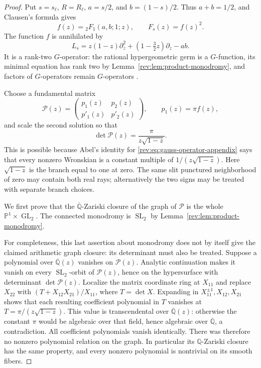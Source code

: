 \begin{proof}
Put $s=s_\ell$, $R=R_\ell$, $a=s/2$, and $b=(1-s)/2$.  Thus
$a+b=1/2$, and Clausen's formula gives
\[
 f(z)={}_2F_1(a,b;1;z),\qquad F_s(z)=f(z)^2.
\]
The function $f$ is annihilated by
\begin{equation}\label{rev:eq:gauss-operator-appendix}
 L_s=z(1-z)\partial_z^2+
          (1-\tfrac32z)\partial_z-ab.
\end{equation}
It is a rank-two $G$-operator: the rational hypergeometric germ is a
$G$-function, its minimal equation has rank two by
Lemma~\ref{rev:lem:product-monodromy}, and factors of $G$-operators
remain $G$-operators \cite[Theorem~3.5]{BaldiBinyaminiUrbanik2026}.

Choose a fundamental matrix
\[
 \mathcal P(z)=
 \begin{pmatrix}p_1(z)&p_2(z)\\p'_1(z)&p'_2(z)\end{pmatrix},
 \qquad p_1(z)=\pi f(z),
\]
and scale the second solution so that
\begin{equation}\label{eq:C-wronskian}
 \det\mathcal P(z)=\frac{\pi}{z\sqrt{1-z}}.
\end{equation}
This is possible because Abel's identity for
\eqref{rev:eq:gauss-operator-appendix} says that every nonzero Wronskian is a
constant multiple of $1/(z\sqrt{1-z})$.  Here $\sqrt{1-z}$ is the
branch equal to one at zero.  The same slit punctured neighborhood
of zero may contain both real rays; alternatively the two signs
may be treated with separate branch choices.

We first prove that the $\overline{\mathbb Q}$-Zariski closure of
the graph of $\mathcal P$ is the whole
$\mathbb P^1\times\operatorname{GL}_2$.  The connected monodromy is $\operatorname{SL}_2$ by
Lemma~\ref{rev:lem:product-monodromy}.

For completeness, this last assertion about monodromy does not by
itself give the claimed arithmetic graph closure: its determinant
must also be treated.  Suppose a polynomial over
$\overline{\mathbb Q}(z)$ vanishes on $\mathcal P(z)$.  Analytic
continuation makes it vanish on every
$\operatorname{SL}_2$-orbit of $\mathcal P(z)$, hence on the
hypersurface with determinant $\det\mathcal P(z)$.  Localize the
matrix coordinate ring at $X_{11}$ and replace $X_{22}$ with
$(T+X_{12}X_{21})/X_{11}$, where $T=\det X$.  Expanding in
$X_{11}^{\pm1},X_{12},X_{21}$ shows that each resulting coefficient
polynomial in $T$ vanishes at
$T=\pi/(z\sqrt{1-z})$.  This value is transcendental over
$\overline{\mathbb Q}(z)$: otherwise the constant $\pi$ would be
algebraic over that field, hence algebraic over
$\overline{\mathbb Q}$, a contradiction.  All coefficient
polynomials vanish identically.  There was therefore no nonzero
polynomial relation on the graph.  In particular its
$\mathbb Q$-Zariski closure has the same property, and every
nonzero polynomial is nontrivial on its smooth fibers.


\end{proof}
